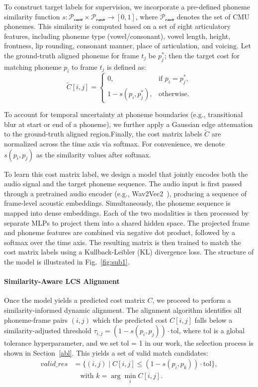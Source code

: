 To construct target labels for supervision, we incorporate a pre-defined phoneme similarity function $s: \mathcal{P_\text{cmu}} \times \mathcal{P_\text{cmu}} \rightarrow [0,1]$, where $\mathcal{P_\text{cmu}}$ denotes the set of CMU phonemes. This similarity is computed based on a set of eight articulatory features, including phoneme type (vowel/consonant), vowel length, height, frontness, lip rounding, consonant manner, place of articulation, and voicing. Let the ground-truth aligned phoneme for frame $t_j$ be $p^*_j$; then the target cost for matching phoneme $p_i$ to frame $t_j$ is defined as:
\[
\tilde{C}[i,j] =
\begin{cases}
0, & \text{if } p_i = p^*_j, \\
1 - s(p_i, p^*_j), & \text{otherwise}.
\end{cases}
\]

To account for temporal uncertainty at phoneme boundaries (e.g., transitional blur at start or end of a phoneme), we further apply a Gaussian edge attenuation to the ground-truth aligned region.Finally, the cost matrix labels $\tilde{C}$ are normalized across the time axis via softmax. For convenience, we denote $s(p_i,p_j)$ as the similarity values after softmax.

To learn this cost matrix label, we design a model that jointly encodes both the audio signal and the target phoneme sequence. The audio input is first passed through a pretrained audio encoder (e.g., Wav2Vec2~\cite{baevski2020wav2vec20frameworkselfsupervised}), producing a sequence of frame-level acoustic embeddings. Simultaneously, the phoneme sequence is mapped into dense embeddings. Each of the two modalities is then processed by separate MLPs to project them into a shared hidden space. The projected frame and phoneme features are combined via negative dot product, followed by a softmax over the time axis. The resulting matrix is then trained to match the cost matrix labels using a Kullback-Leibler (KL) divergence loss. The structure of the model is illustrated in Fig.~\ref{fig:sub1}.

\paragraph{Similarity-Aware LCS Alignment} Once the model yields a predicted cost matrix $C$, we proceed to perform a similarity-informed dynamic alignment. The alignment algorithm identifies all phoneme-frame pairs $(i,j)$ which the predicted cost $C[i,j]$ falls below a similarity-adjusted threshold $\tau_{i,j} = (1 - s(p_i, p_j)) \cdot \text{tol}$, where $\text{tol}$ is a global tolerance hyperparameter, and we set tol = 1 in our work, the selection process is shown in Section~\ref{abl}. This yields a set of valid match candidates:
\[
\begin{aligned}
valid\_res &= \{(i,j) \mid C[i,j] \leq (1 - s(p_i, p_k)) \cdot \text{tol}\}, \\
&\quad \text{with } k = \arg\min_{i} C[i,j].
\end{aligned}
\]

